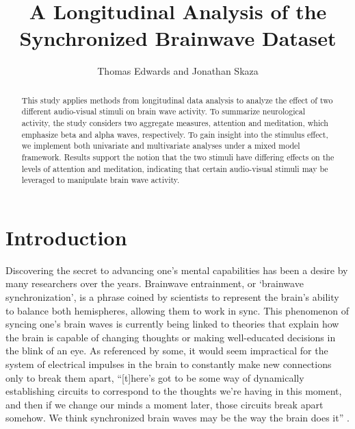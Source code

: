 \documentclass{article}[12pt]
\title{A Longitudinal Analysis of the Synchronized Brainwave Dataset}
\author{Thomas Edwards and Jonathan Skaza}
\begin{document}
\maketitle
\begin{abstract}
This study applies methods from longitudinal data analysis to analyze the effect of two different audio-visual stimuli on brain wave activity. To summarize neurological activity, the study considers two aggregate measures, attention and meditation, which emphasize beta and alpha waves, respectively. To gain insight into the stimulus effect, we implement both univariate and multivariate analyses under a mixed model framework. Results support the notion that the two stimuli have differing effects on the levels of attention and meditation, indicating that certain audio-visual stimuli may be leveraged to manipulate brain wave activity. 
\end{abstract}
\section{Introduction}

Discovering the secret to advancing one's mental capabilities has been a desire by many researchers over the years. Brainwave entrainment, or `brainwave synchronization', is a phrase coined by scientists to represent the brain's ability to balance both hemispheres, allowing them to work in sync. This phenomenon of syncing one's brain waves is currently being linked to theories that explain how the brain is capable of changing thoughts or making well-educated decisions in the blink of an eye. As referenced by some, it would seem impractical for the system of electrical impulses in the brain to constantly make new connections only to break them apart, ``[t]here's got to be some way of dynamically establishing circuits to correspond to the thoughts we're having in this moment, and then if we change our minds a moment later, those circuits break apart somehow. We think synchronized brain waves may be the way the brain does it'' \cite{trafton}. 
\end{document}
